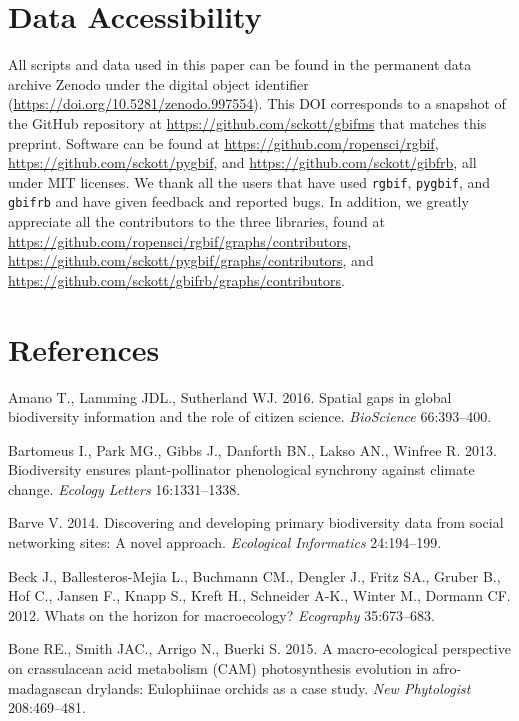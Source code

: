 \documentclass[author-year, review, 11pt]{components/elsarticle} %
\begin{document}
\section{Data Accessibility}\label{data-accessibility}

All scripts and data used in this paper can be found in the permanent
data archive Zenodo under the digital object identifier
(\url{https://doi.org/10.5281/zenodo.997554}). This DOI corresponds to a
snapshot of the GitHub repository at
\url{https://github.com/sckott/gbifms} that matches this preprint.
Software can be found at \url{https://github.com/ropensci/rgbif},
\url{https://github.com/sckott/pygbif}, and
\url{https://github.com/sckott/gibfrb}, all under MIT licenses. We thank
all the users that have used \texttt{rgbif}, \texttt{pygbif}, and
\texttt{gbifrb} and have given feedback and reported bugs. In addition,
we greatly appreciate all the contributors to the three libraries, found
at \url{https://github.com/ropensci/rgbif/graphs/contributors},
\url{https://github.com/sckott/pygbif/graphs/contributors}, and
\url{https://github.com/sckott/gbifrb/graphs/contributors}.

\section*{References}\label{references}

\hypertarget{refs}{}
\hypertarget{ref-Amano_2016}{}
Amano T., Lamming JDL., Sutherland WJ. 2016. Spatial gaps in global
biodiversity information and the role of citizen science.
\emph{BioScience} 66:393--400.

\hypertarget{ref-Bartomeus_2013}{}
Bartomeus I., Park MG., Gibbs J., Danforth BN., Lakso AN., Winfree R.
2013. Biodiversity ensures plant-pollinator phenological synchrony
against climate change. \emph{Ecology Letters} 16:1331--1338.

\hypertarget{ref-Barve_2014}{}
Barve V. 2014. Discovering and developing primary biodiversity data from
social networking sites: A novel approach. \emph{Ecological Informatics}
24:194--199.

\hypertarget{ref-Beck_2012}{}
Beck J., Ballesteros-Mejia L., Buchmann CM., Dengler J., Fritz SA.,
Gruber B., Hof C., Jansen F., Knapp S., Kreft H., Schneider A-K., Winter
M., Dormann CF. 2012. Whats on the horizon for macroecology?
\emph{Ecography} 35:673--683.

\hypertarget{ref-Bone_2015}{}
Bone RE., Smith JAC., Arrigo N., Buerki S. 2015. A macro-ecological
perspective on crassulacean acid metabolism (CAM) photosynthesis
evolution in afro-madagascan drylands: Eulophiinae orchids as a case
study. \emph{New Phytologist} 208:469--481.
\end{document}
